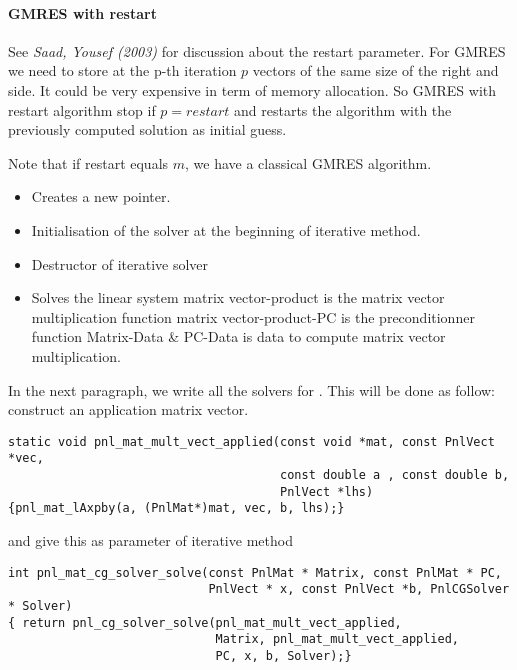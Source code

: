 \paragraph{GMRES with restart} See {\em Saad, Yousef (2003)} for discussion
about the restart parameter. For GMRES we need to store at the p-th iteration
$p$ vectors of the same size of the right and side. It could be very expensive
in term of memory allocation. So GMRES with restart algorithm stop if
$p=restart$ and restarts the algorithm with the previously computed solution
as initial guess.

Note that if restart equals $m$, we have a classical GMRES algorithm.

\begin{itemize}
\item {}
  \sshortdescribe Creates a new  pointer.  
\item {}
  \sshortdescribe Initialisation of the solver at the beginning of iterative method.  
\item {}
  \sshortdescribe Destructor of iterative solver  
\item {}
  \sshortdescribe Solves the linear system matrix vector-product is the matrix vector multiplication function matrix vector-product-PC is the preconditionner function Matrix-Data \& PC-Data is data to compute matrix vector multiplication.  
\end{itemize}


In the next paragraph, we write all the solvers for . This will be done as
follow: construct an application matrix vector.
\begin{verbatim}
static void pnl_mat_mult_vect_applied(const void *mat, const PnlVect *vec, 
                                      const double a , const double b, 
                                      PnlVect *lhs)
{pnl_mat_lAxpby(a, (PnlMat*)mat, vec, b, lhs);}
\end{verbatim}
and give this as parameter of iterative method
\begin{verbatim}
int pnl_mat_cg_solver_solve(const PnlMat * Matrix, const PnlMat * PC, 
                            PnlVect * x, const PnlVect *b, PnlCGSolver * Solver)
{ return pnl_cg_solver_solve(pnl_mat_mult_vect_applied, 
                             Matrix, pnl_mat_mult_vect_applied, 
                             PC, x, b, Solver);}
\end{verbatim}

